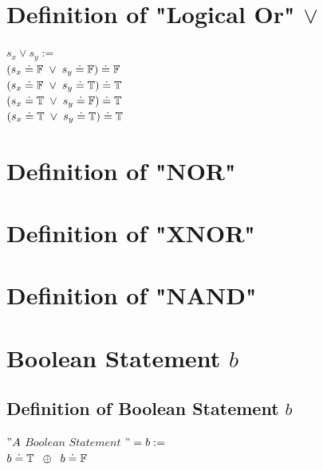 \documentclass[11pt]{article}
\begin{document}
\section{Definition of "Logical Or" $\lor$}
\begin{center}
$
s_x \lor s_y :=
$
\\ \vspace{3mm}
$
(s_x \doteq \mathbb{F} \hspace{1mm} \lor \hspace{1mm} s_y\doteq \mathbb{F}) \doteq \mathbb{F}
$
\\ \vspace{3mm}
$
(s_x \doteq \mathbb{F} \hspace{1mm} \lor \hspace{1mm} s_y\doteq \mathbb{T}) \doteq \mathbb{T}
$
\\ \vspace{3mm}
$
(s_x \doteq \mathbb{T} \hspace{1mm} \lor \hspace{1mm} s_y\doteq \mathbb{F}) \doteq \mathbb{T}
$
\\ \vspace{3mm}
$
(s_x \doteq \mathbb{T} \hspace{1mm} \lor \hspace{1mm} s_y\doteq \mathbb{T}) \doteq \mathbb{T}
$
\end{center}





\section{Definition of "NOR"}
\section{Definition of "XNOR"}
\section{Definition of "NAND"}




\section{Boolean Statement $b$}
\subsection{Definition of Boolean Statement $b$}
\begin{center}
$
"A$ $Boolean$ $Statement$ $" = b:=
$
\\ \vspace{2mm}
$
b \doteq \mathbb{T} \hspace{2mm} \oplus \hspace{2mm} b \doteq  \mathbb{F}
$
\end{center}
\end{document}
